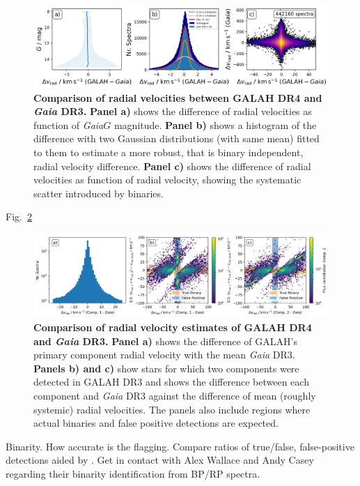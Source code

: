 \documentclass[
  journal=pasa,
  manuscript=research-paper, %
  year=2024,
  volume=37
]{cup-journal}
\newcommand{\Gaia}{\textit{Gaia}\xspace}
\begin{document}
\begin{figure}[ht]
 \centering
 \includegraphics[width=\textwidth]{figures/galah_dr4_vrad_gaia_dr3.png}
 \caption{\textbf{Comparison of radial velocities between GALAH DR4 and \Gaia DR3.}
 \textbf{Panel a)} shows the difference of radial velocities as function of \Gaia $G$ magnitude.
 \textbf{Panel b)} shows a histogram of the difference with two Gaussian distributions (with same mean) fitted to them to estimate a more robust, that is binary independent, radial velocity difference.
 \textbf{Panel c)} shows the difference of radial velocities as function of radial velocity, showing the systematic scatter introduced by binaries.
}
 \label{fig:galah_dr4_vrad_gaia_dr3}
\end{figure}

Fig.~\ref{fig:vrad_comparison_comp1_comp2_gaiadr3}

\begin{figure}[hbt]
 \centering
 \includegraphics[width=\textwidth]{figures/vrad_comparison_comp1_comp2_gaiadr3.png}
 \caption{\textbf{Comparison of radial velocity estimates of GALAH DR4 and \textit{Gaia} DR3.} \textbf{Panel a)} shows the difference of GALAH's primary component radial velocity with the mean \textit{Gaia} DR3. \textbf{Panels b) and c)} show stars for which two components were detected in GALAH DR3 and shows the difference between each component and \textit{Gaia} DR3 against the difference of mean (roughly systemic) radial velocities. The panels also include regions where actual binaries and false positive detections are expected.}
 \label{fig:vrad_comparison_comp1_comp2_gaiadr3}
\end{figure}

Binarity. How accurate is the flagging. Compare ratios of true/false, false-positive detections aided by \citet{Traven2020}. Get in contact with Alex Wallace and Andy Casey regarding their binarity identification from BP/RP spectra.
\end{document}
